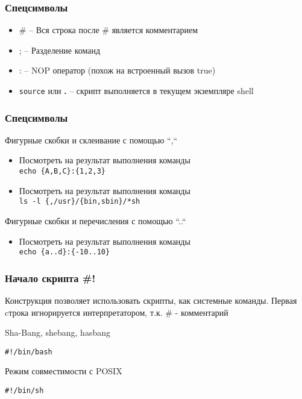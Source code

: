 



\begin{frame}
	\frametitle{Спецсимволы}

	\begin{itemize}
		\item \# -- Вся строка после \# является комментарием
		\item ; -- Разделение команд
		\item : -- NOP оператор (похож на встроенный вызов true)
		\item {\tt source} или {\bf .} -- скрипт выполняется в текущем экземпляре shell
	\end{itemize}

\end{frame}


\begin{frame}
	\frametitle{Спецсимволы}

	\begin{block}{Фигурные скобки и склеивание с помощью ``,``}
		\begin{itemize}
			\item Посмотреть на результат выполнения команды \\
				{\tt echo \{A,B,C\}:\{1,2,3\}}
				\pause
			\item Посмотреть на результат выполнения команды \\
				{\tt ls -l \{,/usr\}/\{bin,sbin\}/*sh}
		\end{itemize}
	\end{block}

	\pause

	\begin{block}{Фигурные скобки и перечисления с помощью ``..``}
		\begin{itemize}
			\item Посмотреть на результат выполнения команды \\
				{\tt echo \{a..d\}:\{-10..10\}}
		\end{itemize}
	\end{block}

\end{frame}

\begin{frame}[fragile]
	\frametitle{Начало скрипта \#!}

        Конструкция позволяет использовать скрипты, как системные команды. 
        Первая cтрока игнорируется интерпретатором, т.к. \# - комментарий

	\begin{block}{Sha-Bang, shebang, hasbang}
		\begin{lstlisting}
#!/bin/bash
		\end{lstlisting}
	\end{block}

	\begin{block}{Режим совместимости с POSIX}
		\begin{lstlisting}
#!/bin/sh
		\end{lstlisting}

	\end{block}

\end{frame}

